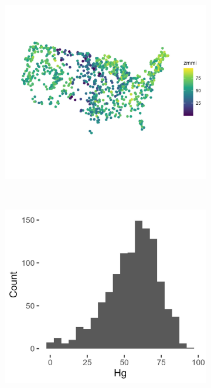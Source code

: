 \documentclass[]{elsarticle} %
\begin{document}
\begin{figure}
\centering
\begin{subfigure}{0.98\textwidth}
  \centering
  \includegraphics[width = 1\linewidth]{figures/zmmi_map.jpeg}
  \caption*{}
  \label{fig:zmmi_map}
\end{subfigure} \\
\begin{subfigure}{0.49\textwidth}
  \centering
  \includegraphics[width = 1\linewidth]{figures/zmmi_hist.jpeg}

\end{subfigure}
\end{figure}
\end{document}
